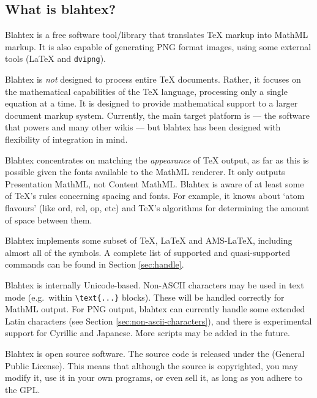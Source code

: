 \documentclass{article}
\newcommand{\texcommand}[1]{\textbackslash{}#1}
\begin{document}
\subsection{What is blahtex?}

Blahtex is a free software tool/library that translates \TeX{} markup into MathML markup. It is also capable of generating PNG format images, using some external tools (\LaTeX{} and \texttt{dvipng}).

Blahtex is \emph{not} designed to process entire \TeX{} documents. Rather, it focuses on the mathematical capabilities of the \TeX{} language, processing only a single equation at a time. It is designed to provide mathematical support to a larger document markup system. Currently, the main target platform is  --- the software that powers  and many other wikis --- but blahtex has been designed with flexibility of integration in mind.

Blahtex concentrates on matching the \emph{appearance} of \TeX{} output, as far as this is possible given the fonts available to the MathML renderer. It only outputs Presentation MathML, not Content MathML. Blahtex is aware of at least some of \TeX{}'s rules concerning spacing and fonts. For example, it knows about `atom flavours' (like ord, rel, op, etc) and \TeX{}'s algorithms for determining the amount of space between them.

Blahtex implements some subset of \TeX{}, \LaTeX{} and AMS-\LaTeX{}, including almost all of the symbols. A complete list of supported and quasi-supported commands can be found in Section \ref{sec:handle}.

Blahtex is internally Unicode-based. Non-ASCII characters may be used in text mode (e.g.~within \texttt{\texcommand{text}\{...\}} blocks). These will be handled correctly for MathML output. For PNG output, blahtex can currently handle some extended Latin characters (see Section \ref{sec:non-ascii-characters}), and there is experimental support for Cyrillic and Japanese. More scripts may be added in the future.

Blahtex is open source software. The source code is released under the  (General Public License). This means that although the source is copyrighted, you may modify it, use it in your own programs, or even sell it, as long as you adhere to the GPL.
\end{document}
